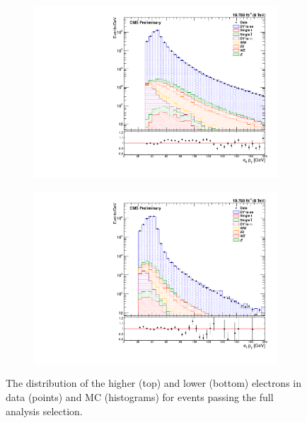 \begin{figure}[!htbp]
    \centering
    \begin{subfigure}[b]{0.65\textwidth}
        \includegraphics[width=\textwidth]{figures/e0_pt.pdf}
        \caption{}
        \label{fig:e_pt_high}
    \end{subfigure}
    \begin{subfigure}[b]{0.65\textwidth}
        \includegraphics[width=\textwidth]{figures/e1_pt.pdf}
        \caption{}
        \label{fig:e_pt_low}
    \end{subfigure}
    \caption[
        The \pt distribution of electrons in data.
    ]{
        The \pt distribution of the higher (top) and lower (bottom) \pt
        electrons in data (points) and MC (histograms) for events passing the
        full analysis selection.
    }
    \label{fig:e_pt}
\end{figure}

